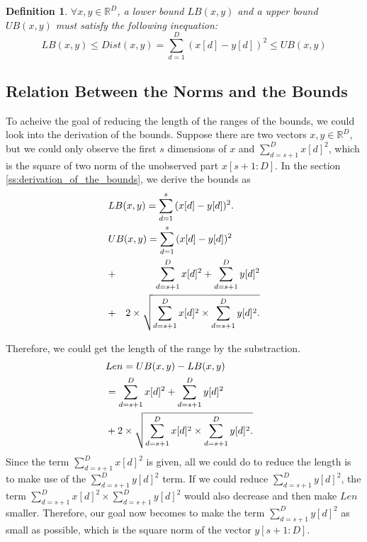 \newtheorem{Bounds}{\bf Definition}
\begin{Bounds}
\normalfont
$\forall x,y \in \mathbb{R}^D$, a lower bound $LB(x,y)$ and a upper bound $UB(x,y)$ must satisfy the following inequation:
\[
LB(x,y)\leq Dist(x,y) =\sum^D_{d=1}{(x[d]-y[d])^2} \leq UB(x,y)
\]
\end{Bounds}

\subsection{Relation Between the Norms and the Bounds} %
\label{sub:relation_between_the_norms_and_the_bounds}

To acheive the goal of reducing the length of the ranges of the bounds, we could look into the derivation of the bounds. Suppose there are two vectors $x,y\in \mathbb{R}^D$, but we could only observe the first $s$ dimensions of $x$ and $\sum^D_{d=s+1}{x[d]^2}$, which is the square of two norm of the unobserved part $x[s+1:D]$.  In the section \ref{ss:derivation_of_the_bounds}, we derive the bounds as 
{
\begin{eqnarray*}
\lefteqn{LB(x,y) = \sum^s_{d=1}{(x[d]-y[d])^2}.} \label{eq:single-LB-tmp} \\
\lefteqn{UB(x,y) = \sum^s_{d=1}{(x[d]-y[d])^2}} \notag \\
& + & \sum^D_{d=s+1}{x[d]^2}+\sum^D_{d=s+1}{y[d]^2} \notag \\
& + & 2 \times \sqrt{\sum^D_{d=s+1}{x[d]^2}\times \sum^D_{d=s+1}{y[d]^2}.}\label{eq:single-UB-tmp}
\end{eqnarray*}
}

Therefore, we could get the length of the range by the substraction.
{
\begin{eqnarray*}
\lefteqn{Len = UB(x,y) - LB(x,y)}\\
& = \sum^D_{d=s+1}{x[d]^2}+\sum^D_{d=s+1}{y[d]^2} \\
& + 2 \times \sqrt{\sum^D_{d=s+1}{x[d]^2}\times \sum^D_{d=s+1}{y[d]^2}.}\label{eq:len-range}
\end{eqnarray*}
}
Since the term $\sum^D_{d=s+1}{x[d]^2}$ is given, all we could do to reduce the length is to make use of the $\sum^D_{d=s+1}{y[d]^2}$ term.  If we could reduce $\sum^D_{d=s+1}{y[d]^2}$, the term $\sum^D_{d=s+1}{x[d]^2}\times \sum^D_{d=s+1}{y[d]^2}$ would also decrease and then make $Len$ smaller.  Therefore, our goal now becomes to make the term $\sum^D_{d=s+1}{y[d]^2}$ as small as possible, which is the square norm of the vector $y[s+1:D]$.

